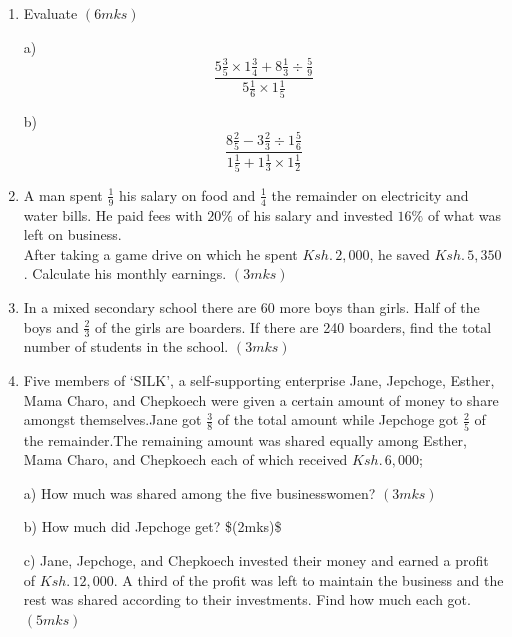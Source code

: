 \documentclass[
  a4paperpaper,
]{scrbook}
\begin{document}
\begin{tcolorbox}
\begin{enumerate}
\def\labelenumi{\arabic{enumi}.}
\setcounter{enumi}{11}
\item
  Evaluate \hspace{12.8cm} \((6mks)\)

  a)
  \[\frac{5\frac{3}{5}\times 1\frac{3}{4}+8\frac{1}{3} \div \frac{5}{9}}{5\frac{1}{6}\times 1\frac{1}{5}}\]

  b)
  \[\frac{8\frac{2}{5}-3\frac{2}{3}\div 1\frac{5}{6}}{1\frac{1}{5}+ 1\frac{1}{3}\times 1\frac{1}{2}}\]
\item
  A man spent \(\frac{1}{9}\) his salary on food and \(\frac{1}{4}\) the
  remainder on electricity and water bills. He paid fees with \(20\%\)
  of his salary and invested \(16\%\) of what was left on business.\\
  After taking a game drive on which he spent \(Ksh. \,2,000\), he saved
  \(Ksh.\,5,350\). Calculate his monthly earnings. \((3mks)\)
\item
  In a mixed secondary school there are 60 more boys than girls. Half of
  the boys and \(\frac{2}{3}\) of the girls are boarders. If there are
  240 boarders, find the total number of students in the school.
  \hspace{14.2cm} \((3mks)\)
\item
  Five members of `SILK', a self-supporting enterprise Jane, Jepchoge,
  Esther, Mama Charo, and Chepkoech were given a certain amount of money
  to share amongst themselves.Jane got \(\frac{3}{8}\) of the total
  amount while Jepchoge got \(\frac{2}{5}\) of the remainder.The
  remaining amount was shared equally among Esther, Mama Charo, and
  Chepkoech each of which received \(Ksh.\, 6,000\);

  a) How much was shared among the five businesswomen? \hspace{4.3cm}
  \((3mks)\)

  b) How much did Jepchoge get? \hspace{8.5cm} \$(2mks)\$

  c) Jane, Jepchoge, and Chepkoech invested their money and earned a
  profit of \(Ksh.\, 12,000\). A third of the profit was left to
  maintain the business and the rest was shared according to their
  investments. Find how much each got.\hspace{6.5cm} \((5mks)\)
\end{enumerate}

\end{tcolorbox}

\end{document}
